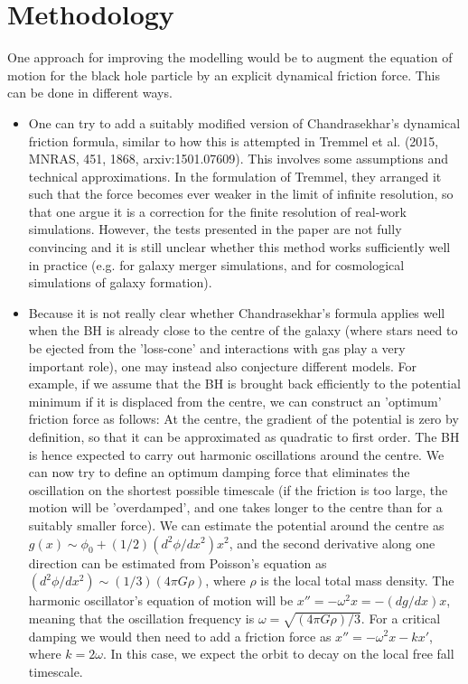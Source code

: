 \documentclass[a4,useAMS,usenatbib,usegraphicx,12pt]{article}
\begin{document}
\section{Methodology}


One approach for improving the modelling would be to augment the equation of 
motion for the black hole particle by an explicit dynamical friction force. 
This can be done in different ways.

\begin{itemize} 
\item One can try to add a suitably modified version of Chandrasekhar's dynamical 
friction formula, similar to how this is attempted in Tremmel et al. (2015, MNRAS, 
451, 1868, arxiv:1501.07609). This involves some assumptions and technical 
approximations. In the formulation of Tremmel, they arranged it such that the 
force becomes ever weaker in the limit of infinite resolution, so that one argue 
it is a correction for the finite resolution of real-work simulations. However, 
the tests presented in the paper are not fully convincing and it is still unclear 
whether this method works sufficiently well in practice (e.g. for galaxy merger 
simulations, and for cosmological simulations of galaxy formation).

\item Because it is not really clear whether Chandrasekhar's formula applies 
well when the BH is already close to the centre of the galaxy (where stars need 
to be ejected from the 'loss-cone' and interactions with gas play a very important 
role), one may instead also conjecture different models. For example, if we assume 
that the BH is brought back efficiently to the potential minimum if it is displaced 
from the centre, we can construct an 'optimum' friction force as follows: At the 
centre, the gradient of the potential is zero by definition, so that it can be 
approximated as quadratic to first order. The BH is hence expected to carry out 
harmonic oscillations around the centre. We can now try to define an optimum damping 
force that eliminates the oscillation on the shortest possible timescale (if the 
friction is too large, the motion will be 'overdamped', and one takes longer to the 
centre than for a suitably smaller force). We can estimate the potential around the 
centre as $g(x) \sim \phi_0 + (1/2) (d^2\phi/dx^2) x^2$, and the second derivative
along one direction can be estimated from Poisson's equation as $(d^2\phi/dx^2) 
\sim (1/3) (4 \pi G \rho)$, where $\rho$ is the local total mass density. The 
harmonic oscillator's equation of motion will be $x'' = - \omega^2 x = - (dg/dx) x$, 
meaning that the oscillation frequency is $\omega = \sqrt{(4 \pi G \rho)/3}$. 
For a critical damping we would then need to add a friction force as $x'' = 
-\omega^2 x - k x'$, where $k = 2 \omega$. In this case, we expect the orbit to 
decay on the local free fall timescale.


\end{itemize}
\end{document}
